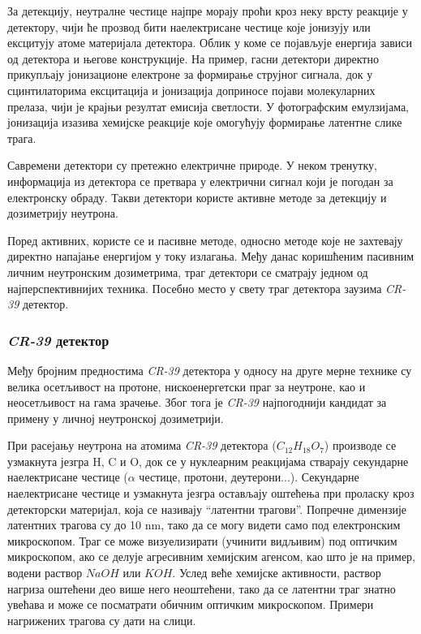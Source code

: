 \documentclass[12pt,a4paper,serbian,oneside]{book}
\begin{document}
За детекцију, неутралне честице најпре морају проћи кроз неку врсту реакције у детектору, чији ће прозвод бити наелектрисане честице које јонизују или ексцитују атоме материјала детектора. Облик у коме се појављује енергија зависи од детектора и његове конструкције.  На пример, гасни детектори директно прикупљају јонизационе електроне за формирање струјног сигнала, док у сцинтилаторима  ексцитација и јонизација доприносе појави молекуларних прелаза, чији је крајњи резултат емисија светлости. У фотографским емулзијама, јонизација изазива хемијске реакције које омогућују формирање латентне слике трага.

Савремени детектори су претежно електричне природе. У неком тренутку, информација из детектора се претвара у електрични сигнал који је погодан за електронску обраду. Такви детектори користе активне методе за детекцију и дозиметрију неутрона. 

Поред активних, користе се и пасивне методе, односно методе које не захтевају директно напајање енергијом у току излагања.  Међу данас коришћеним пасивним личним неутронским дозиметрима, траг детектори се сматрају једном од најперспективнијих техника. Посебно место у свету траг детектора заузима \textit{CR-39} детектор.

\subsubsection{\textit{CR-39} детектор}

Међу бројним предностима \textit{CR-39} детектора у односу на друге мерне технике су велика осетљивост на протоне, нискоенергетски праг за неутроне, као и неосетљивост на гама зрачење. Због тога је \textit{CR-39} најпогоднији кандидат за примену у личној неутронској дозиметрији.

При расејању неутрона на атомима \textit{CR-39} детектора ($C_{12}H_{18}O_{7}$) производе се
узмакнута језгра H, C и O, док се у нуклеарним реакцијама стварају секундарне
наелектрисане честице ($\alpha$ честице, протони, деутерони...). Секундарне наелектрисане честице и узмакнута језгра остављају оштећења при проласку кроз детекторски материјал, која се називају “латентни трагови”. Попречне димензије латентних трагова су до 10 nm, тако да се могу видети само под електронским микроскопом. Траг се може визуелизирати (учинити видљивим) под оптичким микроскопом, ако се делује агресивним хемијским агенсом, као што је на пример, водени раствор $NaOH$ или $KOH$. Услед веће хемијске активности, раствор нагриза оштећени део више него неоштећени, тако да се латентни траг знатно увећава и може се посматрати обичним оптичким микроскопом. Примери нагрижених трагова су дати на слици.
\end{document}
